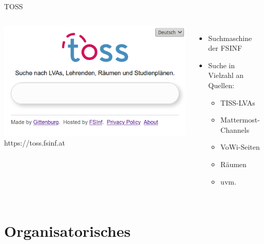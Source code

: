 \documentclass{beamer}
\begin{document}
\begin{frame}{TOSS}
  \begin{columns}
      \centering
      \includegraphics[width=\textwidth]{toss.png}
      https://toss.fsinf.at
      \begin{itemize}
        \item Suchmaschine der FSINF
        \item Suche in Vielzahl an Quellen:
        \begin{itemize}
            \item TISS-LVAs
            \item Mattermost-Channels
            \item VoWi-Seiten
            \item Räumen
            \item uvm.
        \end{itemize}
      \end{itemize}
  \end{columns}
\end{frame}

\section{Organisatorisches}
\end{document}
